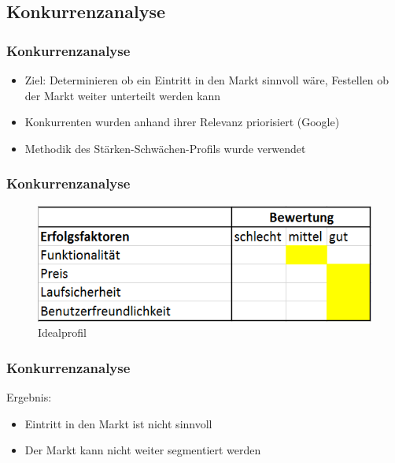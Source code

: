 \documentclass[12pt]{beamer}
\begin{document}
\subsection{Konkurrenzanalyse}
\begin{frame}
\frametitle{Konkurrenzanalyse}
\begin{itemize}
\item Ziel: Determinieren ob ein Eintritt in den Markt sinnvoll wäre, Festellen ob der Markt weiter unterteilt werden kann
\item Konkurrenten wurden anhand ihrer Relevanz priorisiert (Google)
\item Methodik des Stärken-Schwächen-Profils wurde verwendet
\end{itemize}
\end{frame}
\begin{frame}
\frametitle{Konkurrenzanalyse}
\begin{figure}
\includegraphics[scale=0.6]{Bilder/Idealprofil}
\caption{Idealprofil}
\end{figure}
\end{frame}
\begin{frame}
\frametitle{Konkurrenzanalyse}
Ergebnis:
\newline
\begin{itemize}
\item Eintritt in den Markt ist nicht sinnvoll
\item Der Markt kann nicht weiter segmentiert werden
\end{itemize}
\end{frame}
\end{document}
